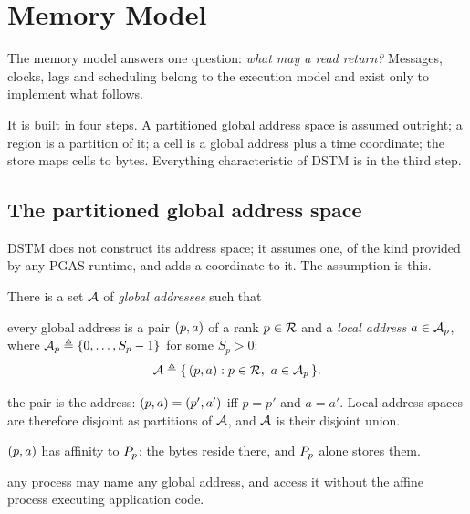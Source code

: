 \section{Memory Model}
\label{sec:memory-model}

The memory model answers one question: \emph{what may a read return?}
Messages, clocks, lags and scheduling belong to the execution model and exist
only to implement what follows.

It is built in four steps. A partitioned global address space is assumed
outright; a region is a partition of it; a \gls{cell} is a global address plus
a time coordinate; the \gls{store} maps cells to bytes. Everything
characteristic of DSTM is in the third step.

\subsection{The partitioned global address space}
\label{sec:pgas}

DSTM does not construct its address space; it assumes one, of the kind
provided by any PGAS runtime, and adds a coordinate to it. The assumption is
this.

\begin{axiom}\label{ax:pgas}
There is a set $\mathcal{A}$ of \emph{global addresses} such that
\begin{description}[leftmargin=2.9cm,style=nextline,font=\normalfont\bfseries]
  \item[\textnormal{(A1) Partition}] every global address is a pair
    $(p,a)$ of a rank $p \in \mathcal{R}$ and a \emph{local address}
    $a \in \mathcal{A}_{p}$, where $\mathcal{A}_{p} \triangleq \{0, \dots, S_p - 1\}$ for
    some $S_p > 0$:
    \[
      \mathcal{A} \triangleq \{\, (p,a) : p \in \mathcal{R},\ a \in \mathcal{A}_{p} \,\} .
    \]
  \item[\textnormal{(A2) Uniqueness}] the pair is the address: $(p,a) =
    (p',a')$ iff $p = p'$ and $a = a'$. Local address spaces are
    therefore disjoint as partitions of $\mathcal{A}$, and $\mathcal{A}$ is their disjoint
    union.
  \item[\textnormal{(A3) Affinity}] $(p,a)$ has affinity to $P_{p}$:
    the bytes reside there, and $P_{p}$ alone stores them.
  \item[\textnormal{(A4) One-sidedness}] any process may name any global
    address, and access it without the affine process executing application
    code.
\end{description}
\end{axiom}


